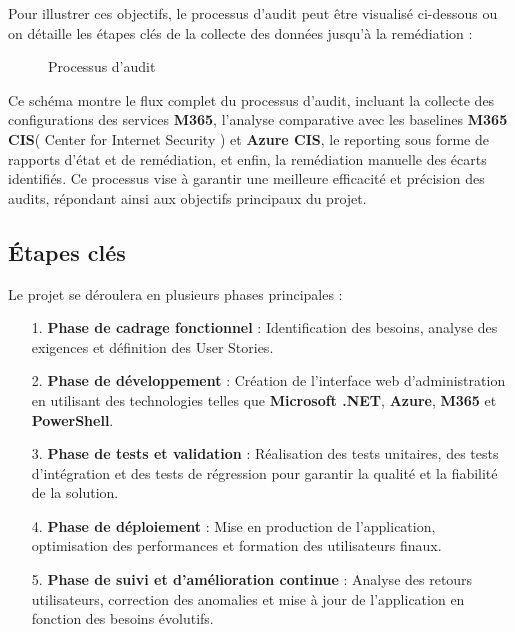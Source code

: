 Pour illustrer ces objectifs, le processus d'audit peut être visualisé ci-dessous ou on détaille les étapes clés de la collecte des données jusqu'à la remédiation :

\begin{figure}[H]
    \begin{center}
        \caption{Processus d'audit}
    \end{center}
\end{figure}

Ce schéma montre le flux complet du processus d'audit, incluant la collecte des configurations des services \textbf{M365}, l'analyse comparative avec les baselines \textbf{M365 CIS}( Center for Internet Security ) et \textbf{Azure CIS}, le reporting sous forme de rapports d'état et de remédiation, et enfin, la remédiation manuelle des écarts identifiés. Ce processus vise à garantir une meilleure efficacité et précision des audits, répondant ainsi aux objectifs principaux du projet.

\subsection{Étapes clés}

Le projet se déroulera en plusieurs phases principales :
\begin{itemize}
    \item[1.] \textbf{Phase de cadrage fonctionnel} : Identification des besoins, analyse des exigences et définition des User Stories.
    \item[2.] \textbf{Phase de développement} : Création de l'interface web d'administration en utilisant des technologies telles que \textbf{Microsoft .NET}, \textbf{Azure}, \textbf{M365} et \textbf{PowerShell}.
    \item[3.] \textbf{Phase de tests et validation} : Réalisation des tests unitaires, des tests d'intégration et des tests de régression pour garantir la qualité et la fiabilité de la solution.
    \item[4.] \textbf{Phase de déploiement} : Mise en production de l'application, optimisation des performances et formation des utilisateurs finaux.
    \item[5.] \textbf{Phase de suivi et d'amélioration continue} : Analyse des retours utilisateurs, correction des anomalies et mise à jour de l'application en fonction des besoins évolutifs.
\end{itemize}

